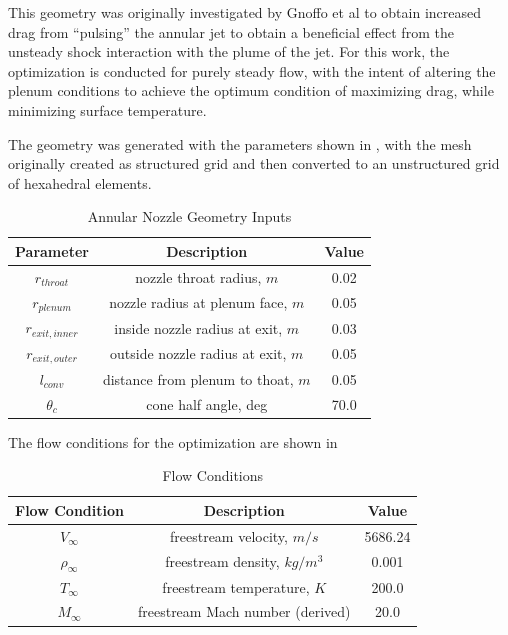 This geometry was originally investigated by Gnoffo et
al\cite{gnoffo2016tapping} to obtain increased drag from ``pulsing'' the annular
jet to obtain a beneficial effect from the unsteady shock interaction with the
plume of the jet.  For this work, the optimization is conducted for purely steady
flow, with the intent of altering the plenum conditions to achieve the optimum
condition of maximizing drag, while minimizing surface temperature.

The geometry was generated with the parameters shown in ,
with the mesh originally created as structured grid and then converted to an
unstructured grid of hexahedral elements.
\begin{table}[h]
  \centering
  \begin{tabular}{c|c|c}
    Parameter & Description & Value \\
    \hline
    $r_{throat}$       &   nozzle throat radius, $m$           & 0.02 \\
    $r_{plenum}$       &   nozzle radius at plenum face, $m$   & 0.05 \\
    $r_{exit,inner}$   &   inside nozzle radius at exit, $m$   & 0.03 \\
    $r_{exit,outer}$   &   outside nozzle radius at exit, $m$  & 0.05 \\
    $l_{conv}$         &   distance from plenum to thoat, $m$  & 0.05 \\
    $\theta_c$         &   cone half angle, deg                & 70.0
  \end{tabular}
  \caption{Annular Nozzle Geometry Inputs}
  \label{tab:annular-geom}
\end{table}
The flow conditions for the optimization are shown in 
\begin{table}[!h]
  \centering
  \begin{tabular}{c|c|c}
    Flow Condition & Description & Value \\
    \hline
    $V_{\infty}$    & freestream velocity, $m/s$        & 5686.24 \\
    $\rho_{\infty}$ & freestream density, $kg/m^3$      & 0.001 \\
    $T_{\infty}$    & freestream temperature, $K$       & 200.0 \\
    $M_{\infty}$    & freestream Mach number (derived)  & 20.0
  \end{tabular}
  \caption{Flow Conditions}
  \label{tab:flow-conditions}
\end{table}
